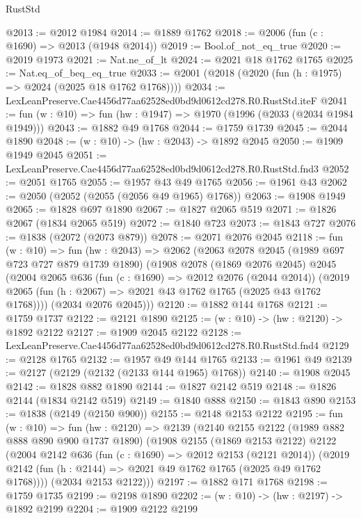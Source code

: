 \begin{lexlean}{RustStd}
\begin{coremodule}
@2013 := @2012 @1984
@2014 := @1889 @1762
@2018 := @2006 (fun (c : @1690) => @2013 (@1948 @2014))
@2019 := Bool.of_not_eq_true
@2020 := @2019 @1973
@2021 := Nat.ne_of_lt
@2024 := @2021 @18 @1762 @1765
@2025 := Nat.eq_of_beq_eq_true
@2033 := @2001 (@2018 (@2020 (fun (h : @1975) => @2024 (@2025 @18 @1762 @1768))))
@2034 := LexLeanPreserve.Cae4456d77aa62528ed0bd9d0612cd278.R0.RustStd.iteF
@2041 := fun (w : @10) => fun (hw : @1947) => @1970 (@1996 (@2033 (@2034 @1984 @1949)))
@2043 := @1882 @49 @1768
@2044 := @1759 @1739
@2045 := @2044 @1890
@2048 := (w : @10) -> (hw : @2043) -> @1892 @2045
@2050 := @1909 @1949 @2045
@2051 := LexLeanPreserve.Cae4456d77aa62528ed0bd9d0612cd278.R0.RustStd.fnd3
@2052 := @2051 @1765
@2055 := @1957 @43 @49 @1765
@2056 := @1961 @43
@2062 := @2050 (@2052 (@2055 (@2056 @49 @1965) @1768))
@2063 := @1908 @1949
@2065 := @1828 @697 @1890
@2067 := @1827 @2065 @519
@2071 := @1826 @2067 (@1834 @2065 @519)
@2072 := @1840 @723
@2073 := @1843 @727
@2076 := @1838 (@2072 (@2073 @879))
@2078 := @2071 @2076 @2045
@2118 := fun (w : @10) =>
  fun (hw : @2043) =>
  @2062
    (@2063
      @2078
      @2045
      (@1989 @697 @723 @727 @879 @1739 @1890)
      (@1908
        @2078
        (@1869 @2076 @2045)
        @2045
        (@2004
          @2065
          @636
          (fun (c : @1690) => @2012 @2076 (@2044 @2014))
          (@2019 @2065 (fun (h : @2067) => @2021 @43 @1762 @1765 (@2025 @43 @1762 @1768))))
        (@2034 @2076 @2045)))
@2120 := @1882 @144 @1768
@2121 := @1759 @1737
@2122 := @2121 @1890
@2125 := (w : @10) -> (hw : @2120) -> @1892 @2122
@2127 := @1909 @2045 @2122
@2128 := LexLeanPreserve.Cae4456d77aa62528ed0bd9d0612cd278.R0.RustStd.fnd4
@2129 := @2128 @1765
@2132 := @1957 @49 @144 @1765
@2133 := @1961 @49
@2139 := @2127 (@2129 (@2132 (@2133 @144 @1965) @1768))
@2140 := @1908 @2045
@2142 := @1828 @882 @1890
@2144 := @1827 @2142 @519
@2148 := @1826 @2144 (@1834 @2142 @519)
@2149 := @1840 @888
@2150 := @1843 @890
@2153 := @1838 (@2149 (@2150 @900))
@2155 := @2148 @2153 @2122
@2195 := fun (w : @10) =>
  fun (hw : @2120) =>
  @2139
    (@2140
      @2155
      @2122
      (@1989 @882 @888 @890 @900 @1737 @1890)
      (@1908
        @2155
        (@1869 @2153 @2122)
        @2122
        (@2004
          @2142
          @636
          (fun (c : @1690) => @2012 @2153 (@2121 @2014))
          (@2019 @2142 (fun (h : @2144) => @2021 @49 @1762 @1765 (@2025 @49 @1762 @1768))))
        (@2034 @2153 @2122)))
@2197 := @1882 @171 @1768
@2198 := @1759 @1735
@2199 := @2198 @1890
@2202 := (w : @10) -> (hw : @2197) -> @1892 @2199
@2204 := @1909 @2122 @2199

\end{coremodule}
\end{lexlean}
